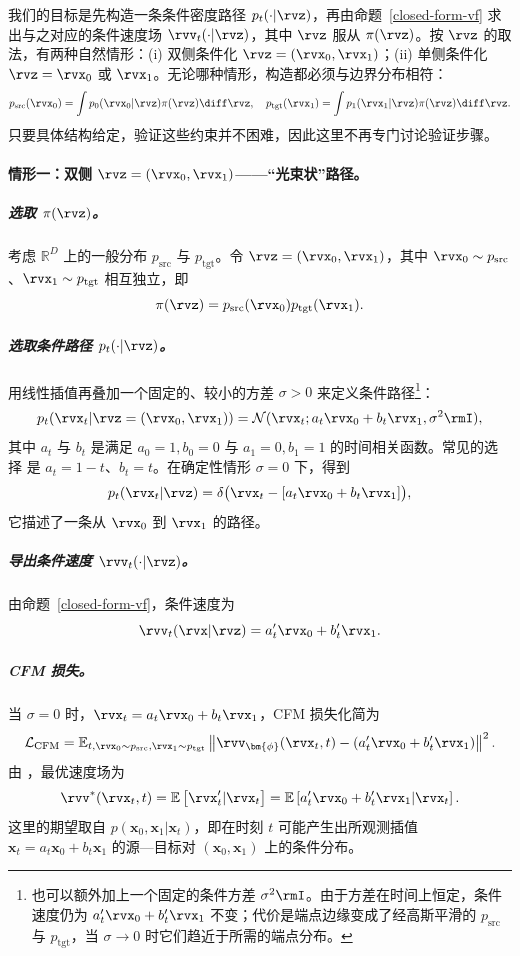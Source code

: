 我们的目标是先构造一条条件密度路径 $p_t(\cdot|\rvz)$，再由命题~\ref{closed-form-vf} 求出与之对应的条件速度场 $\rvv_t(\cdot|\rvz)$，其中 $\rvz$ 服从 $\pi(\rvz)$。按 $\rvz$ 的取法，有两种自然情形：(i) 双侧条件化 $\rvz=(\rvx_0,\rvx_1)$；(ii) 单侧条件化 $\rvz=\rvx_0$ 或 $\rvx_1$。无论哪种情形，构造都必须与边界分布相符：
\begin{align*}
   p_{\mathrm{src}}(\rvx_0) = \int p_0(\rvx_0|\rvz) \pi(\rvz)\diff\rvz, \quad
   p_{\mathrm{tgt}}(\rvx_1) = \int p_1(\rvx_1|\rvz) \pi(\rvz) \diff\rvz.
\end{align*}
只要具体结构给定，验证这些约束并不困难，因此这里不再专门讨论验证步骤。


\paragraph{情形一：双侧 $\rvz = (\rvx_0, \rvx_1)$——“光束状”路径。}
    \subparagraph{选取 $\pi(\rvz)$。} 考虑 $\mathbb{R}^D$ 上的一般分布 $p_{\mathrm{src}}$ 与 $p_{\mathrm{tgt}}$。令 $\rvz = (\rvx_0, \rvx_1)$，其中 $\rvx_0 \sim p_{\mathrm{src}}$、$\rvx_1 \sim p_{\mathrm{tgt}}$ 相互独立，即
    \[
    \pi(\rvz) = p_{\mathrm{src}}(\rvx_0)  p_{\mathrm{tgt}}(\rvx_1).
    \]
    \subparagraph{选取条件路径 $p_t(\cdot|\rvz)$。} 用线性插值再叠加一个固定的、较小的方差 $\sigma > 0$ 来定义条件路径\footnote{
也可以额外加上一个固定的条件方差 $\sigma^2\rmI$。由于方差在时间上恒定，条件速度仍为 $a_t'\rvx_0+b_t'\rvx_1$ 不变；代价是端点边缘变成了经高斯平滑的 $p_{\mathrm{src}}$ 与 $p_{\mathrm{tgt}}$，当 $\sigma\to0$ 时它们趋近于所需的端点分布。
}：
    \[
    p_t(\rvx_t | \rvz = (\rvx_0, \rvx_1)) = \mathcal{N}(\rvx_t; a_t\rvx_0 + b_t\rvx_1,  \sigma^2 \rmI),
    \]
    其中 $a_t$ 与 $b_t$ 是满足 $a_0 = 1,  b_0 = 0$ 与 $a_1 = 0,  b_1 = 1$ 的时间相关函数。常见的选择\citep{lipman2022flow,liu2022rectified} 是 $a_t = 1-t$、$b_t = t$。在确定性情形 $\sigma = 0$ 下，得到
\[
p_t(\rvx_t |\rvz) = \delta \big(\rvx_t - [a_t\rvx_0 + b_t\rvx_1]\big),
\]
它描述了一条从 $\rvx_0$ 到 $\rvx_1$ 的路径。
    \subparagraph{导出条件速度 $\rvv_t(\cdot|\rvz)$。} 由命题~\ref{closed-form-vf}，条件速度为
    \[
    \rvv_t(\rvx | \rvz) = a'_t\rvx_0 + b'_t\rvx_1.
    \]
    \subparagraph{CFM 损失。} 当 $\sigma=0$ 时，$\rvx_t = a_t\rvx_0 + b_t\rvx_1$，CFM 损失化简为
    \[
    \mathcal{L}_{\mathrm{CFM}} = \mathbb{E}_{t, \rvx_0\sim p_{\text{src}}, \rvx_1\sim p_{\text{tgt}}} \left\| \rvv_{\bm{\phi}}(\rvx_t, t) - \left(a'_t\rvx_0 + b'_t\rvx_1\right) \right\|^2.
    \]
由 ，最优速度场为
\[
\rvv^*(\rvx_t, t) = \mathbb{E} \left[ \rvx_t'|\rvx_t \right] = \mathbb{E} \left[ a'_t\rvx_0 + b'_t\rvx_1|\rvx_t \right].
\]
这里的期望取自 $p(\mathbf{x}_0, \mathbf{x}_1|\mathbf{x}_t)$，即在时刻 $t$ 可能产生出所观测插值 $\mathbf{x}_t = a_t\mathbf{x}_0 + b_t\mathbf{x}_1$ 的源—目标对 $(\mathbf{x}_0, \mathbf{x}_1)$ 上的条件分布。


